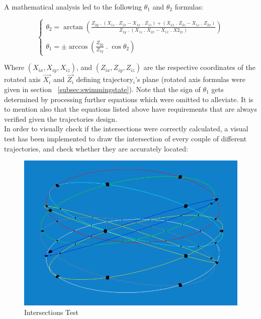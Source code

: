A mathematical analysis led to the following $\theta_1$ and $\theta_2$ formulas:

\[
\left\{
\begin{array}{ll}
	\theta_2  = \arctan \left(
	\frac{\displaystyle Z_{2y} \;.\; (X_{1z} \;.\; Z_{1x} - X_{1x} \;.\; Z_{1z}) + (X_{1x} \;.\; Z_{2z} - X_{1z} \;.\; Z_{2x})}{\displaystyle Z_{1y} \;.\; (X_{1z} \;.\; X_{2x} - X_{1x} \;.\; X2_{2z})}
	\right) \\ \\
	
	\theta_1 = \pm \arccos\left(  \frac{\displaystyle Z_{2y}} {\displaystyle Z_{1y}} \;.\; \cos \theta_2 \right)
\end{array}
\right.
\]

Where $(X_{ix}, X_{iy}, X_{iz})$, and $(Z_{ix}, Z_{iy}, Z_{iz})$ are the respective coordinates of the rotated axis $\overrightarrow{X_i}$ and $\overrightarrow{Z_i}$ defining trajectory$_i$'s plane (rotated axis formulas were given in section ~\ref{subsec:swimmingstate}). Note that the sign of $\theta_1$ gets determined by processing further equations which were omitted to alleviate. It is to mention also that the equations listed above have requirements that are always verified given the trajectories design.\\

In order to visually check if the intersections were correctly calculated, a visual test has been implemented to draw the intersection of every couple of different trajectories, and check whether they are accurately located:

\begin{figure}[H]
   \centering
   \includegraphics[scale=0.5]{figures/intersections.png}
   \caption{Intersections Test}
   \label{fig:intersections}
\end{figure}

